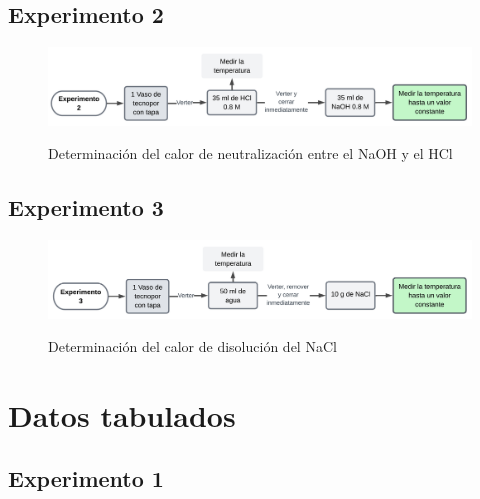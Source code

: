\documentclass[10pt]{article}
\begin{document}
\subsection{Experimento 2}
    \begin{figure}[H]
	\begin{center}
         \caption{Determinación del calor de neutralización entre el NaOH y el HCl}  {\label{fig:exp2}} 
        \includegraphics[width = 1\textwidth]{Imagenes/Exp2.png}
	\end{center}
    \end{figure}
    
\subsection{Experimento 3}
    \begin{figure}[H]
	\begin{center}
         \caption{Determinación del calor de disolución del NaCl}  {\label{fig:exp3}} 
        \includegraphics[width = 1\textwidth]{Imagenes/Exp3.png}
	\end{center}
    \end{figure}

\newpage
\section{Datos tabulados}
\subsection{Experimento 1}
\end{document}
